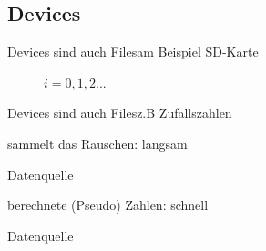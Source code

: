 \documentclass{beamer}
\begin{document}
\subsection{Devices}
\begin{frame}{Devices sind auch Files}{am Beispiel SD-Karte}
 \begin{description}
  \item[] $i=0,1,2 ...$
 \end{description}
\end{frame}

\begin{frame}{Devices sind auch Files}{z.B Zufallszahlen}
 \begin{description}
  \item[\cod{/dev/random}] sammelt das Rauschen: langsam
  \begin{description}
   \item[Datenquelle] 
  \end{description}
  \item[\cod{/dev/urandom}] berechnete (Pseudo) Zahlen: schnell
  \begin{description}
   \item[Datenquelle]
  \end{description}
 \end{description}
\end{frame}
\end{document}

